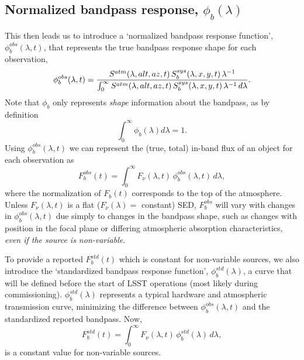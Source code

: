 \documentclass[12pt,preprint]{aastex}
\begin{document}
\subsection{Normalized bandpass response, $\phi_b(\lambda)$}
\label{sec:phi}

This then leads us to introduce a `normalized bandpass response
function', $\phi_b^{obs}(\lambda,t)$, that represents the true
bandpass response shape for each observation,
\begin{equation}
\label{eqn:PhiDef}
   \phi_b^{obs}(\lambda,t) =  {
     {S^{atm}(\lambda,alt,az,t)\, S_b^{sys}(\lambda,x,y,t) \,
       \lambda^{-1}} \over
     \int_0^\infty { {S^{atm}(\lambda,alt,az,t) \,
         S_b^{sys}(\lambda,x,y,t) \, \lambda^{-1}} \,d\lambda}}.
\end{equation}
Note that $\phi_b$ only represents {\it shape} information about the
bandpass, as by definition
\begin{equation}
\int_0^\infty {\phi_b(\lambda)  d\lambda}=1. 
\end{equation}
Using $\phi_b^{obs}(\lambda, t)$ we can represent the (true, total)
in-band flux of an object for each observation as
\begin{equation}
\label{eqn:Fb}
F_b^{obs}(t) = \int_0^\infty {F_\nu(\lambda,t) \,\phi_b^{obs}(\lambda,t) \, d\lambda},
\end{equation}
where the normalization of $F_b(t)$ corresponds to the top of the
atmosphere. Unless $F_\nu(\lambda,t)$ is a flat ($F_\nu(\lambda)=$
constant) SED, $F_b^{obs}$ will vary with changes in
$\phi_b^{obs}(\lambda,t)$ due simply to changes in the bandpass shape,
such as changes with position in the focal plane or differing
atmospheric absorption characteristics, {\it even if the source is
non-variable}.

To provide a reported $F_b^{std}(t)$ which is constant for
non-variable sources, we also introduce the `standardized bandpass response
function', $\phi_b^{std}(\lambda)$, a curve that will be defined before
the start of LSST operations (most likely during
commissioning). $\phi_b^{std}(\lambda)$ represents a typical hardware
and atmospheric transmission curve, minimizing the difference between
$\phi_b^{obs}(\lambda,t)$ and the standardized reported bandpass.
Now, 
\begin{equation}
\label{eqn:stdFlux}
F_b^{std}(t) = \int_0^{\infty} {F_\nu(\lambda,t) \,
  \phi_b^{std}(\lambda) \, d\lambda}, 
\end{equation}
is a constant value for non-variable sources. 
\end{document}
